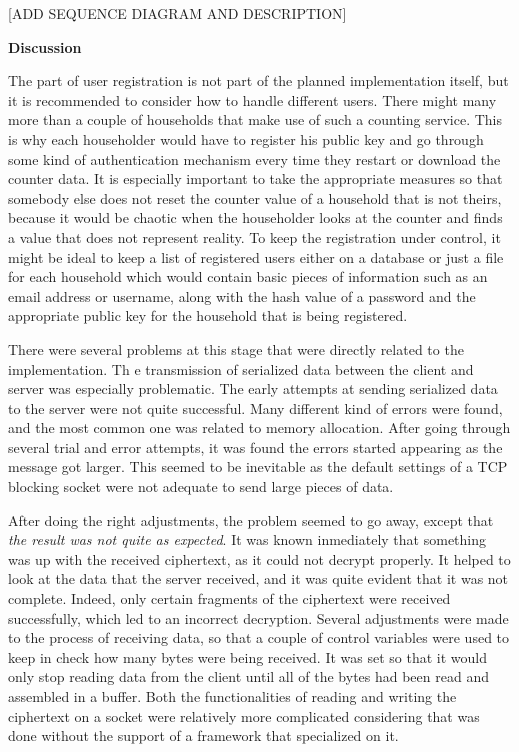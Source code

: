 [ADD SEQUENCE DIAGRAM AND DESCRIPTION]


\textbf{Discussion}

The part of user registration is not part of the planned implementation itself, but it is recommended to consider how to handle different users. There might many more than a couple of households that make use of such a counting service. This is why each householder would have to register his public key and go through some kind of authentication mechanism every time they restart or download the counter data. It is especially important to take the appropriate measures so that somebody else does not reset the counter value of a household that is not theirs, because it would be chaotic when the householder looks at the counter and finds a value that does not represent reality.
To keep the registration under control, it might be ideal to keep a list of registered users either on a database or just a file for each household which would contain basic pieces of information such as an email address or username, along with the hash value of a password and the appropriate public key for the household that is being registered.

There were several problems at this stage that were directly related to the implementation. Th
e transmission of serialized data between the client and server was especially problematic. The early attempts at sending serialized data to the server were not quite successful. Many different kind of errors were found, and the most common one was related to memory allocation. After going through several trial and error attempts, it was found the errors started appearing as the message got larger. This seemed to be inevitable as the default settings of a TCP blocking socket were not adequate to send large pieces of data. 

After doing the right adjustments, the problem seemed to go away, except that \textit{the result was not quite as expected}. It was known inmediately that something was up with the received ciphertext, as it could not decrypt properly. It helped to look at the data that the server received, and it was quite evident that it was not complete. Indeed, only certain fragments of the ciphertext were received successfully, which led to an incorrect decryption. Several adjustments were made to the process of receiving data, so that a couple of control variables were used to keep in check how many bytes were being received. It was set so that it would only stop reading data from the client until all of the bytes had been read and assembled in a buffer. Both the functionalities of reading and writing the ciphertext on a socket were relatively more complicated considering that was done without the support of a framework that specialized on it.

